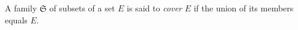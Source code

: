 A family \(\mathfrak{S}\) of subsets of a set \(E\) is said to \textit{cover} \(E\) if the union of its members equals \(E\).
